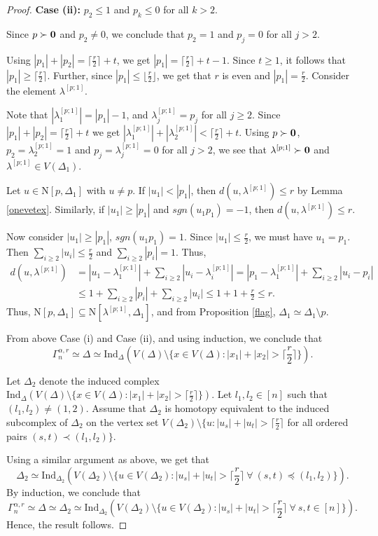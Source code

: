 \documentclass{amsart}
\theoremstyle{definition}
\theoremstyle{remark}
\numberwithin{equation}{section}
\newcommand{\D}{\Delta}
\newcommand{\f}{\lfloor\frac{r}{2}\rfloor}
\newcommand{\cil}{\lceil\frac{r}{2}\rceil}
\def\n{{\mathrm{N}}}
\begin{document}
\begin{proof}
	\noindent\textbf{Case (ii):} $p_2 \leq 1$ and $p_k \leq 0$ for all $k > 2$.
	
	Since $p \succ {\bf{0}}$ and $p_2 \neq 0$, we conclude that $p_2 =1$ and $p_j = 0$ for all $j > 2$.
	
	Using $|p_1| + |p_2| = \cil + t$, we get $|p_1| = \cil + t - 1$. Since $t \geq 1$, it follows that $|p_1| \geq \cil $.  Further, since $|p_1 | \leq \f$, we get that $r$ is even and $|p_1| = \frac{r}{2}$. Consider the element $\lambda^{[p;1]}$.
	
	Note that $|\lambda^{[p;1]}_1|=|p_1|-1$, and $\lambda_j^{[p;1]} = p_j$ for all $j \geq 2$. Since $|p_1|+|p_2|=\cil + t$ we get $|\lambda^{[p;1]}_1|+|\lambda^{[p;1]}_2| < \cil + t$. Using $p\succ {\bf{0}}$, $p_2 = \lambda_2^{[p;1]}=1$ and $p_j = \lambda_j^{[p;1]}=0$ for all $j>2$, we see that $\lambda^{[p;1]}\succ {\bf{0}}$ and $\lambda^{[p;1]} \in V(\Delta_1)$.
	
	Let $u \in \n[p, \D_1]$ with $u \neq p$. If $|u_1| < |p_1|$, then $d(u, \lambda^{[p;1]}) \leq r$ by Lemma \ref{onevetex}. Similarly, if $|u_1| \geq |p_1|$ and $sgn(u_1 p_1) = -1$, then $d(u, \lambda^{[p;1]}) \leq r$.
	
	Now consider $|u_1| \geq |p_1|$, $sgn(u_1 p_1) = 1$. Since $|u_1|\leq \frac{r}{2}$, we must have $u_1 = p_1$. Then $\sum_{i \geq 2} |u_i| \leq \frac{r}{2}$ and $\sum_{i \geq 2} |p_i| =1$. Thus,
	\begin{align*}
		d(u, \lambda^{[p;1]}) &= |u_1 - \lambda^{[p;1]}_1| + \sum_{i \geq 2} |u_i - \lambda^{[p;1]}_i| = |p_1 - \lambda^{[p;1]}_1| +  \sum_{i \geq 2} |u_i - p_i| \\
		& \leq 1 + \sum_{i \geq 2} |p_i| + \sum_{i \geq 2} |u_i| \leq 1 + 1 + \frac{r}{2} \leq r. 
	\end{align*}
	Thus, $\n[p, \D_1] \subseteq \n[\lambda^{[p;1]}, \D_1]$, and from Proposition \ref{flag},  $\D_1 \simeq \D_1 \setminus p$. 
	
	From above Case (i) and Case (ii), and using induction, we conclude that 
	$$\Gamma_n^{\alpha, r} \simeq \D \simeq \mathrm{Ind}_{\Delta}(V(\D) \setminus \{x \in V(\D) : |x_1| + |x_2| > \cil\}).
	$$
	
	
	Let $\Delta_2$ denote the induced complex  $\mathrm{Ind}_{\Delta}(V(\D) \setminus \{x \in V(\D) : |x_1| + |x_2| > \cil\})$. Let $l_1, l_2 \in [n]$ such that $(l_1, l_2) \neq (1, 2)$. Assume that  $\Delta_2$ is homotopy equivalent to the induced subcomplex of $\Delta_2$ on the vertex set $V(\Delta_2) \setminus \{u: |u_s| + |u_t| > \cil$ for all ordered pairs $(s, t) \prec (l_1, l_2) \}$.
	
	
	Using a similar argument as above, we get that 
	$$
	\Delta_2 \simeq \mathrm{Ind}_{\Delta_2}(V(\D_2) \setminus \{u \in V(\D_2) : |u_s| + |u_t| > \cil \ \forall \ (s, t) \preceq (l_1, l_2)  \}).
	$$
	By induction, we conclude that 
	$$\Gamma_n^{\alpha, r} \simeq \D \simeq \Delta_2 \simeq \mathrm{Ind}_{\Delta_2}(V(\D_2) \setminus \{u \in V(\D_2) : |u_s| + |u_t| > \cil \ \forall \ s, t \in [n] \}).$$
	Hence, the result follows.
\end{proof}
\end{document}
